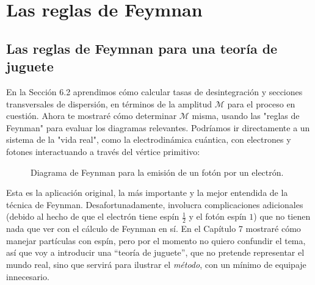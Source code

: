 \chapter{Las reglas de Feymnan }\label{cap.2}

\section{Las reglas de Feymnan para una teoría de juguete} \renewcommand{\thefootnote}{\arabic{footnote}} %

En la Sección 6.2 aprendimos cómo calcular tasas de desintegración y secciones transversales de dispersión, en términos de la amplitud \( \mathcal{M} \) para el proceso en cuestión. Ahora te mostraré cómo determinar \( \mathcal{M} \) misma, usando las "reglas de Feynman" para evaluar los diagramas relevantes. Podríamos ir directamente a un sistema de la "vida real", como la electrodinámica cuántica, con electrones y fotones interactuando a través del vértice primitivo:

\begin{figure}[h!]
    \centering
    \caption{Diagrama de Feynman para la emisión de un fotón por un electrón.}
    \label{fig:emision_foton}
\end{figure}


Esta es la aplicación original, la más importante y la mejor entendida de la técnica de Feynman. 
Desafortunadamente, involucra complicaciones adicionales (debido al hecho de que el electrón tiene espín 
$\tfrac{1}{2}$ y el fotón espín $1$) que no tienen nada que ver con el cálculo de Feynman en sí. 
En el Capítulo 7 mostraré cómo manejar partículas con espín, pero por el momento no quiero confundir 
el tema, así que voy a introducir una ``teoría de juguete'', que no pretende representar el mundo real, 
sino que servirá para ilustrar el \textit{método}, con un mínimo de equipaje innecesario.

